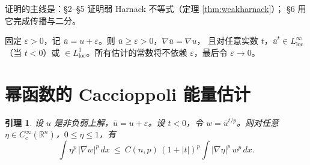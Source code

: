 \documentclass[11pt]{ctexart}
\newcommand{\R}{\mathbb{R}}
\newcommand{\ub}{\bar{u}}
\newcommand{\eps}{\varepsilon}
\theoremstyle{plain}
\newtheorem{lemma}{引理}
\theoremstyle{definition}
\begin{document}
证明的主线是：\S2--\S5 证明弱 Harnack 不等式（定理 \ref{thm:weakharnack}）；
\S6 用它完成传播与二分。

固定 $\eps>0$，记 $\ub=u+\eps$。则 $\ub\ge\eps>0$，$\nabla\ub=\nabla u$，
且对任意实数 $t$，$\ub^{t}\in L^\infty_{\mathrm{loc}}$（当 $t<0$）或
$\in L^1_{\mathrm{loc}}$。所有估计的常数将不依赖 $\eps$，最后令 $\eps\to0$。

\section{幂函数的 Caccioppoli 能量估计}

\begin{lemma}\label{lem:caccioppoli}
设 $u$ 是非负弱上解，$\ub=u+\eps$。设 $t<0$，令 $w=\ub^{t/p}$。则对任意
$\eta\in C_c^\infty(\R^n)$，$0\le\eta\le1$，有
\begin{equation}\label{eq:cacc}
\int \eta^p\,|\nabla w|^p\,dx\ \le\ C(n,p)\,(1+|t|)^p
\int |\nabla\eta|^p\,w^p\,dx .
\end{equation}
\end{lemma}
\end{document}
